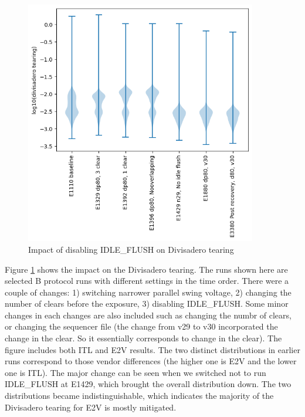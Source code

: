 \begin{figure}
\begin{centering}
\includegraphics[width=0.9\textwidth]{sections/figures/divisadero.png}
\end{centering}
\caption{Impact of disabling IDLE\_FLUSH on Divisadero tearing}\label{IdleFlushEffect:divisadero}
\end{figure}
Figure \ref{IdleFlushEffect:divisadero} shows the impact on the Divisadero tearing. The runs shown here are selected B protocol runs with different settings in the time order. There were a couple of changes: 1) switching narrower parallel swing voltage, 2) changing the number of clears before the exposure, 3) disabling IDLE\_FLUSH.  Some minor changes in each changes are also included such as changing the numbr of clears, or changing the sequencer file (the change from v29 to v30 incorporated the change in the clear. So it essentially corresponds to change in the clear). The figure includes both ITL and E2V results. The two distinct distributions in earlier runs correspond to those vendor differences (the higher one is E2V and the lower one is ITL). The major change can be seen when we switched not to run IDLE\_FLUSH at E1429, which brought the overall distribution down. The two distributions became indistinguishable, which indicates the majority of the Divisadero tearing for E2V is mostly mitigated.

